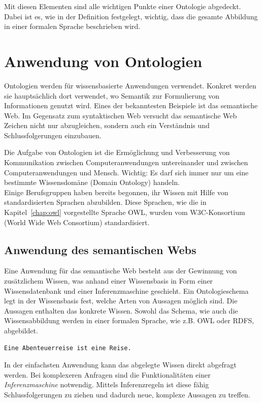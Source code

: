 Mit diesen Elementen sind alle wichtigen Punkte einer Ontologie abgedeckt. Dabei ist es, wie in der Definition festgelegt, wichtig, dass die gesamte Abbildung in einer formalen Sprache beschrieben wird.

\section{Anwendung von Ontologien}
\label{sec:ontologien_onto_anwendung}
Ontologien werden für wissensbasierte Anwendungen verwendet. Konkret werden sie hauptsächlich dort verwendet, wo Semantik zur Formulierung von Informationen genutzt wird. Eines der bekanntesten Beispiele ist das semantische Web. Im Gegensatz zum syntaktischen Web versucht das semantische Web Zeichen nicht nur abzugleichen, sondern auch ein Verständnis und Schlussfolgerungen einzubauen.

Die Aufgabe von Ontologien ist die Ermöglichung und Verbesserung von Kommunikation zwischen Computeranwendungen untereinander und zwischen Computeranwendungen und Mensch. Wichtig: Es darf sich immer nur um eine bestimmte Wissensdomäne (Domain Ontology) handeln.\\
Einige Berufsgruppen haben bereits begonnen, ihr Wissen mit Hilfe von standardisierten Sprachen abzubilden. Diese Sprachen, wie die in Kapitel~\ref{chap:owl} vorgestellte Sprache OWL, wurden vom W3C-Konsortium (World Wide Web Consortium) standardisiert.

\subsection{Anwendung des semantischen Webs}
\label{subsec:ontologien_onto_SemantikWebAnwendung}
Eine Anwendung für das semantische Web besteht aus der Gewinnung von zusätzlichem Wissen, was anhand einer Wissensbasis in Form einer Wissensdatenbank und einer Inferenzmaschine geschieht. Ein Ontologieschema legt in der Wissensbasis fest, welche Arten von Aussagen möglich sind. Die Aussagen enthalten das konkrete Wissen. Sowohl das Schema, wie auch die Wissensabbildung werden in einer formalen Sprache, wie z.B. OWL oder RDFS, abgebildet.

\begin{lstlisting}[caption={Beispiel einer Aussage in einer Wissensbasis.}]
Eine Abenteuerreise ist eine Reise.
\end{lstlisting}

In der einfachsten Anwendung kann das abgelegte Wissen direkt abgefragt werden. Bei komplexeren Anfragen sind die Funktionalitäten einer \textit{Inferenzmaschine} notwendig. Mittels Inferenzregeln ist diese fähig Schlussfolgerungen zu ziehen und dadurch neue, komplexe Aussagen zu treffen.

